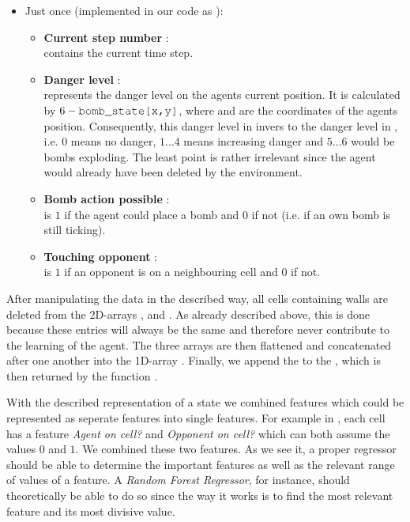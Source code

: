 \begin{itemize}
\begin{itemize}
		\end{itemize}
		\item Just once (implemented in our code as ):
		\begin{itemize}
			\item \textbf{Current step number }:\\
			 contains the current time step.
			\item \textbf{Danger level} :\\
			 represents the danger level on the agents current position. It is calculated by $6 - \text{\code{bomb\_state[x,y]}}$, where  and  are the coordinates of the agents position. Consequently, this danger level in invers to the danger level in , i.e. $0$ means no danger, $1\dots4$ means increasing danger and $5\dots6$ would be bombs exploding. The least point is rather irrelevant since the agent would already have been deleted by the environment.
			\item \textbf{Bomb action possible }:\\
			 is $1$ if the agent could place a bomb and $0$ if not (i.e. if an own bomb is still ticking).
			\item \textbf{Touching opponent} :\\
			 is $1$ if an opponent is on a neighbouring cell and $0$ if not.
		\end{itemize}
	\end{itemize}

	After manipulating the data in the described way, all cells containing walls are deleted from the 2D-arrays ,  and . As already described above, this is done because these entries will always be the same and therefore never contribute to the learning of the agent. The three arrays are then flattened and concatenated after one another into the 1D-array . Finally, we append the  to the , which is then returned by the function .\par
	
	With the described representation of a state we combined features which could be represented as seperate features into single features. For example in \cite{paper}, each cell has a feature \textit{Agent on cell?} and \textit{Opponent on cell?} which can both assume the values $0$ and $1$. We combined these two features. As we see it, a proper regressor should be able to determine the important features as well as the relevant range of values of a feature. A \textit{Random Forest Regressor}, for instance, should theoretically be able to do so since the way it works is to find the most relevant feature and its most divisive value.\par
	
